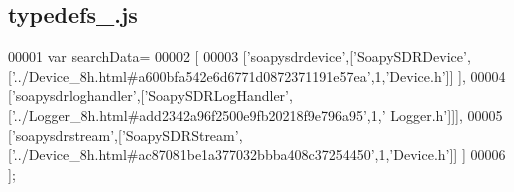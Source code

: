 \subsection{typedefs\+\_.\+js}
\label{typedefs__7_8js_source}

\begin{DoxyCode}
00001 var searchData=
00002 [
00003   [\textcolor{stringliteral}{'soapysdrdevice'},[\textcolor{stringliteral}{'SoapySDRDevice'},[\textcolor{stringliteral}{'../Device\_8h.html#a600bfa542e6d6771d0872371191e57ea'},1,\textcolor{stringliteral}{'Device.h'}]]
      ],
00004   [\textcolor{stringliteral}{'soapysdrloghandler'},[\textcolor{stringliteral}{'SoapySDRLogHandler'},[\textcolor{stringliteral}{'../Logger\_8h.html#add2342a96f2500e9fb20218f9e796a95'},1,\textcolor{stringliteral}{'
      Logger.h'}]]],
00005   [\textcolor{stringliteral}{'soapysdrstream'},[\textcolor{stringliteral}{'SoapySDRStream'},[\textcolor{stringliteral}{'../Device\_8h.html#ac87081be1a377032bbba408c37254450'},1,\textcolor{stringliteral}{'Device.h'}]]
      ]
00006 ];
\end{DoxyCode}
